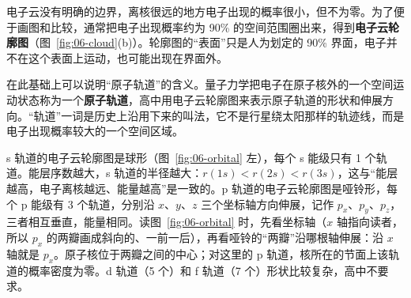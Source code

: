 电子云没有明确的边界，离核很远的地方电子出现的概率很小，但不为零。为了便于画图和比较，通常把电子出现概率约为 90\% 的空间范围圈出来，得到\textbf{电子云轮廓图}（图~\ref{fig:06-cloud}(b)）。轮廓图的“表面”只是人为划定的 90\% 界面，电子并不在这个表面上运动，也可能出现在界面外。


在此基础上可以说明“原子轨道”的含义。量子力学把电子在原子核外的一个空间运动状态称为一个\textbf{原子轨道}，高中用电子云轮廓图来表示原子轨道的形状和伸展方向。“轨道”一词是历史上沿用下来的叫法，它不是行星绕太阳那样的轨迹线，而是电子出现概率较大的一个空间区域。

s 轨道的电子云轮廓图是球形（图~\ref{fig:06-orbital} 左），每个 s 能级只有 1 个轨道。能层序数越大，s 轨道的半径越大：$r(1s)<r(2s)<r(3s)$，这与“能层越高，电子离核越远、能量越高”是一致的。p 轨道的电子云轮廓图是哑铃形，每个 p 能级有 3 个轨道，分别沿 $x$、$y$、$z$ 三个坐标轴方向伸展，记作 $p_x$、$p_y$、$p_z$，三者相互垂直，能量相同。读图~\ref{fig:06-orbital} 时，先看坐标轴（$x$ 轴指向读者，所以 $p_x$ 的两瓣画成斜向的、一前一后），再看哑铃的“两瓣”沿哪根轴伸展：沿 $x$ 轴就是 $p_x$。原子核位于两瓣之间的中心；对这里的 p 轨道，核所在的节面上该轨道的概率密度为零。d 轨道（5 个）和 f 轨道（7 个）形状比较复杂，高中不要求。

